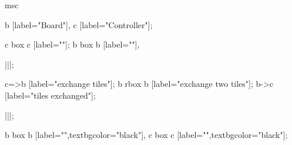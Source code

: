 \begin{msc}
msc
{

b [label="Board"],
c [label="Controller"];

c box c [label=""];
b box b [label=""],

|||;

c=>b [label="exchange tiles"];
b rbox b [label="exchange two tiles"];
b->c [label="tiles exchanged"];

|||;

b box b [label="",textbgcolor="black"],
c box c [label="",textbgcolor="black"];

}
\end{msc}
